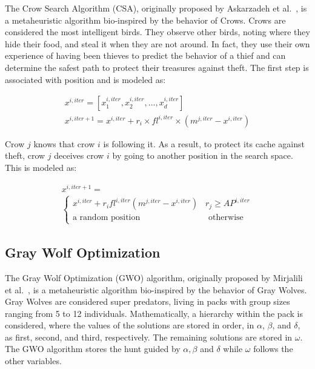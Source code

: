 \documentclass{elsarticle}
\begin{document}
\noindent The Crow Search Algorithm (CSA), originally proposed by Askarzadeh et al.~\cite{Askarzadeh2016}, is a metaheuristic algorithm bio-inspired by the behavior of Crows. Crows are considered the most intelligent birds. They observe other birds, noting where they hide their food, and steal it when they are not around. In fact, they use their own experience of having been thieves to predict the behavior of a thief and can determine the safest path to protect their treasures against theft. The first step is associated with position and is modeled as:

\begin{equation}
\begin{gathered}
x^{i,iter} = [x_{1}^{i,iter}, x_{2}^{i,iter},...,x_{d}^{i,iter}]\\
x^{i,iter+1}=x^{i,iter}+r_{i} \times fl^{i,iter} \times (m^{j,iter}-x^{i,iter})
\end{gathered}
\label{eq23}
\end{equation}

\noindent Crow $j$ knows that crow $i$ is following it. As a result, to protect its cache against theft, crow $j$ deceives crow $i$ by going to another position in the search space. This is modeled as:

\begin{equation}
\begin{gathered}
x^{i,iter+1}=\\
\begin{cases}
x^{i,iter}+r_{i} fl^{i,iter} (m^{j,iter} - x^{i,iter}) \; \; \; r_j \geq AP^{i,iter}\\
\text{a random position} \; \; \; \; \; \;\; \; \;\; \; \;\;\; \; \;\;\; \; \; \; \;\;\; \; \;\; \; \;  \text{otherwise}
\end{cases}
\end{gathered}
\label{eq24}
\end{equation}

\subsection{Gray Wolf Optimization}

\noindent The Gray Wolf Optimization (GWO) algorithm, originally proposed by Mirjalili et al.~\cite{Mirjalili2014}, is a metaheuristic algorithm bio-inspired by the behavior of Gray Wolves. Gray Wolves are considered super predators, living in packs with group sizes ranging from 5 to 12 individuals. Mathematically, a hierarchy within the pack is considered, where the values of the solutions are stored in order, in $\alpha$, $\beta$, and $\delta$, as first, second, and third, respectively. The remaining solutions are stored in $\omega$. The GWO algorithm stores the hunt guided by $\alpha,\beta$ and $\delta$ while $\omega$ follows the other variables.
\end{document}
